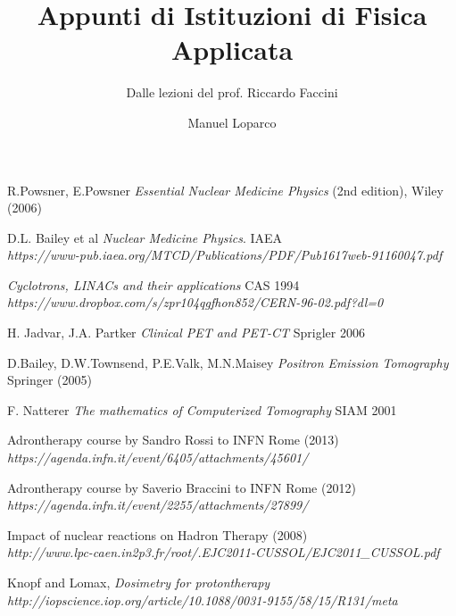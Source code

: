 \documentclass [a4paper, twoside] {book}
\title{Appunti di Istituzioni di Fisica Applicata}
\subtitle{Dalle lezioni del prof. Riccardo Faccini}
\author{Manuel Loparco}
\begin{document}
\maketitle

\tableofcontents
\mainmatter
















\begin{thebibliography}{35}


R.Powsner, E.Powsner 
\textit{Essential Nuclear Medicine Physics}
 (2nd edition), Wiley (2006)

D.L. Bailey et al
\textit{Nuclear Medicine Physics}.
IAEA\\
 \textit{https://www-pub.iaea.org/MTCD/Publications/PDF/Pub1617web-91160047.pdf}

\textit{Cyclotrons, LINACs and their applications}
CAS 1994\\ \textit{https://www.dropbox.com/s/zpr104qgfhon852/CERN-96-02.pdf?dl=0}

H. Jadvar, J.A. Partker
\textit{Clinical PET and PET-CT}
Sprigler 2006

D.Bailey, D.W.Townsend, P.E.Valk, M.N.Maisey
\textit{Positron Emission Tomography}
Springer (2005)

F. Natterer
\textit{The mathematics of Computerized Tomography}
SIAM 2001

Adrontherapy course by Sandro Rossi to INFN Rome (2013)
\\ \textit{https://agenda.infn.it/event/6405/attachments/45601/}

Adrontherapy course by Saverio Braccini to INFN Rome (2012)
\\ \textit{https://agenda.infn.it/event/2255/attachments/27899/}

Impact of nuclear reactions on Hadron Therapy (2008)
\\ \textit{http://www.lpc-caen.in2p3.fr/root/.EJC2011-CUSSOL/EJC2011\_CUSSOL.pdf}

Knopf and Lomax,
\textit{Dosimetry for protontherapy}
\\ \textit{http://iopscience.iop.org/article/10.1088/0031-9155/58/15/R131/meta}


\end{thebibliography}
\end{document}
